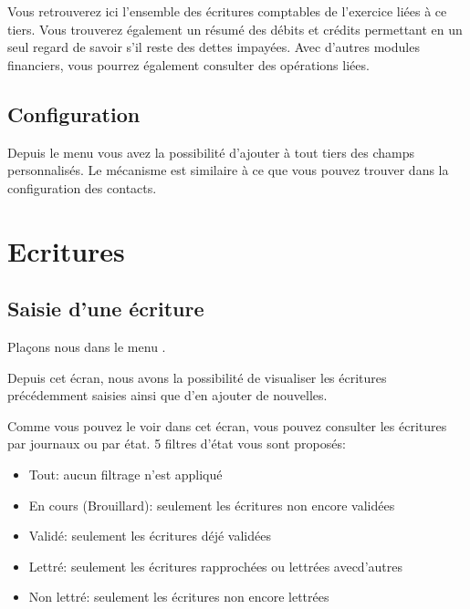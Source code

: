 \documentclass[a4paper,10pt,oneside,french]{sphinxmanual}
\begin{document}
Vous retrouverez ici l’ensemble des écritures comptables de
l’exercice liées à ce tiers. Vous trouverez également un résumé des
débits et crédits permettant en un seul regard de savoir s’il reste des
dettes impayées. Avec d’autres modules financiers, vous pourrez
également consulter des opérations liées.


\subsection{Configuration}
\label{\detokenize{accounting/third:configuration}}
Depuis le menu  vous avez la possibilité d’ajouter à tout tiers des champs personnalisés.
Le mécanisme est similaire à ce que vous pouvez trouver dans la configuration des contacts.


\section{Ecritures}
\label{\detokenize{accounting/entity:ecritures}}\label{\detokenize{accounting/entity::doc}}

\subsection{Saisie d’une écriture}
\label{\detokenize{accounting/entity:saisie-d-une-ecriture}}\begin{quote}

\end{quote}

Plaçons nous dans le menu .
\begin{quote}

\noindent{}
\end{quote}

Depuis cet écran, nous avons la possibilité de visualiser les écritures
précédemment saisies ainsi que d’en ajouter de nouvelles.

Comme vous pouvez le voir dans cet écran, vous pouvez consulter les écritures
par journaux ou par état. 5 filtres d’état vous sont proposés:
\begin{itemize}
\item {} 
Tout: aucun filtrage n’est appliqué

\item {} 
En cours (Brouillard): seulement les écritures non encore validées

\item {} 
Validé: seulement les écritures déjé validées

\item {} 
Lettré: seulement les écritures rapprochées ou lettrées avecd’autres

\item {} 
Non lettré: seulement les écritures non encore lettrées

\end{itemize}
\end{document}
